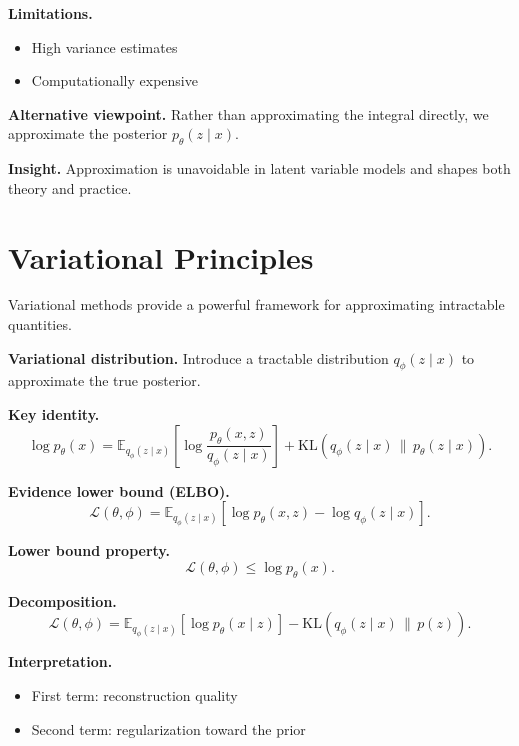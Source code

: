\medskip

\noindent
\textbf{Limitations.}
\begin{itemize}
    \item High variance estimates
    \item Computationally expensive
\end{itemize}

\medskip

\noindent
\textbf{Alternative viewpoint.}  
Rather than approximating the integral directly, we approximate the posterior $p_\theta(z \mid x)$.

\medskip

\noindent
\textbf{Insight.}  
Approximation is unavoidable in latent variable models and shapes both theory and practice.

\section{Variational Principles}

Variational methods provide a powerful framework for approximating intractable quantities.

\medskip

\noindent
\textbf{Variational distribution.}  
Introduce a tractable distribution $q_\phi(z \mid x)$ to approximate the true posterior.

\medskip

\noindent
\textbf{Key identity.}
\[
\log p_\theta(x)
=
\mathbb{E}_{q_\phi(z \mid x)}\left[\log \frac{p_\theta(x, z)}{q_\phi(z \mid x)}\right]
+
\mathrm{KL}(q_\phi(z \mid x) \,\|\, p_\theta(z \mid x)).
\]

\medskip

\noindent
\textbf{Evidence lower bound (ELBO).}
\[
\mathcal{L}(\theta, \phi)
=
\mathbb{E}_{q_\phi(z \mid x)}[\log p_\theta(x, z) - \log q_\phi(z \mid x)].
\]

\medskip

\noindent
\textbf{Lower bound property.}
\[
\mathcal{L}(\theta, \phi) \leq \log p_\theta(x).
\]

\medskip

\noindent
\textbf{Decomposition.}
\[
\mathcal{L}(\theta, \phi)
=
\mathbb{E}_{q_\phi(z \mid x)}[\log p_\theta(x \mid z)]
-
\mathrm{KL}(q_\phi(z \mid x) \,\|\, p(z)).
\]

\medskip

\noindent
\textbf{Interpretation.}
\begin{itemize}
    \item First term: reconstruction quality
    \item Second term: regularization toward the prior
\end{itemize}

